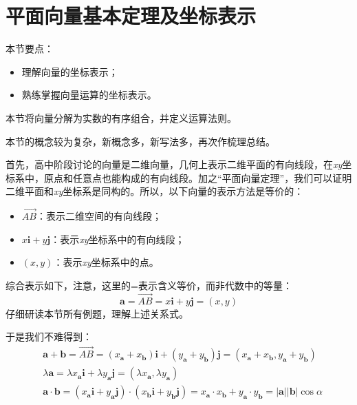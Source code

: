 \section{平面向量基本定理及坐标表示}

本节要点：
\begin{itemize}
    \item 理解向量的坐标表示；
    \item 熟练掌握向量运算的坐标表示。
\end{itemize}

\begin{tcolorbox}
本节将向量分解为实数的有序组合，并定义运算法则。
\end{tcolorbox}

本节的概念较为复杂，新概念多，新写法多，再次作梳理总结。

首先，高中阶段讨论的向量是二维向量，几何上表示二维平面的有向线段，在{\it xy}坐标系中，原点和任意点也能构成的有向线段。加之“平面向量定理”，我们可以证明二维平面和{\it xy}坐标系是同构的。所以，以下向量的表示方法是等价的：
\begin{itemize}
    \item $\overrightarrow{AB}$：表示二维空间的有向线段；
    \item $x\boldsymbol{i}+y\boldsymbol{j}$：表示{\it xy}坐标系中的有向线段；
    \item $\left( x,y \right) $：表示{\it xy}坐标系中的点。
\end{itemize}
综合表示如下，注意，这里的=表示含义等价，而非代数中的等量：
\[
\boldsymbol{a}=\overrightarrow{AB}=x\boldsymbol{i}+y\boldsymbol{j}=\left( x,y \right)
\]
仔细研读本节所有例题，理解上述关系式。

于是我们不难得到：
\begin{align*}
&\boldsymbol{a}+\boldsymbol{b}=\overrightarrow{AB}=\left( x_{\boldsymbol{a}}+x_{\boldsymbol{b}} \right) \boldsymbol{i}+\left( y_{\boldsymbol{a}}+y_{\boldsymbol{b}} \right) \boldsymbol{j}=\left( x_{\boldsymbol{a}}+x_{\boldsymbol{b}},y_{\boldsymbol{a}}+y_{\boldsymbol{b}} \right) \\
&\lambda \boldsymbol{a}=\lambda x_{\boldsymbol{a}}\boldsymbol{i}+\lambda y_{\boldsymbol{a}}\boldsymbol{j}=\left( \lambda x_{\boldsymbol{a}},\lambda y_{\boldsymbol{a}} \right) \\
&\boldsymbol{a}\cdot \boldsymbol{b}=\left( x_{\boldsymbol{a}}\boldsymbol{i}+y_{\boldsymbol{a}}\boldsymbol{j} \right) \cdot \left( x_{\boldsymbol{b}}\boldsymbol{i}+y_{\boldsymbol{b}}\boldsymbol{j} \right) =x_{\boldsymbol{a}}\cdot x_{\boldsymbol{b}}+y_{\boldsymbol{a}}\cdot y_{\boldsymbol{b}}=\left| \boldsymbol{a} \right|\left| \boldsymbol{b} \right|\cos \alpha
\end{align*}


